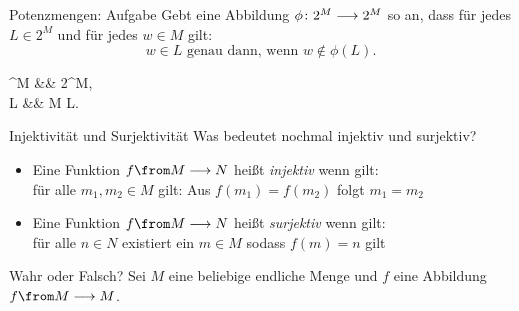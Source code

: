 \begin{frame}{Potenzmengen: Aufgabe}
	Gebt eine Abbildung $\phi \colon 2^{M} \longrightarrow 2^{M}$ so an,
	dass für jedes $L \in 2^{M}$ und für jedes $w \in M$ gilt:
	\begin{equation*}
		w \in L \text{ genau dann, wenn } w \notin \phi(L).
	\end{equation*}
	
	\pause
	\begin{threealign}
		\phi {}^{M} &\functionto& 2^{M},\\
		L &\mapsto& M \setminus L.
	\end{threealign}
\end{frame}

\begin{frame}[t]{Injektivität und Surjektivität}
	Was bedeutet nochmal injektiv und surjektiv?
	\begin{itemize}
		\item Eine Funktion $ f \from M \functionto N $ heißt \textit{injektiv} wenn gilt: \\
			\pause
			für alle $m_1,m_2 \in M$ gilt: Aus $ f(m_1)=f(m_2) $ folgt $ m_1 = m_2 $
		\pause
		\item Eine Funktion $ f \from M \functionto N $ heißt \textit{surjektiv} wenn gilt: \\
			\pause
			für alle $n \in N$ existiert ein $m \in M$ sodass $f(m)=n$ gilt
	\end{itemize}
	\pause
	\begin{block}{Wahr oder Falsch?}
		Sei $M$ eine beliebige endliche Menge und $f$ eine Abbildung $f \from M \functionto M$. \\
	\end{block}
\end{frame}





